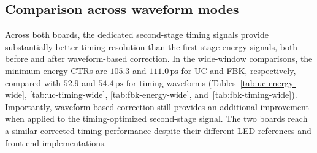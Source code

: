 \subsection{Comparison across waveform modes}
Across both boards, the dedicated second-stage timing signals provide
substantially better timing resolution than the first-stage energy signals,
both before and after waveform-based correction. In the wide-window
comparisons, the minimum energy CTRs are $105.3$ and $111.0\,\mathrm{ps}$
for UC and FBK, respectively, compared with $52.9$ and
$54.4\,\mathrm{ps}$ for timing waveforms
(Tables~\ref{tab:uc-energy-wide}, \ref{tab:uc-timing-wide},
\ref{tab:fbk-energy-wide}, and~\ref{tab:fbk-timing-wide}).
Importantly, waveform-based correction still provides an additional
improvement when applied to the timing-optimized second-stage signal.
The two boards reach a similar corrected timing performance despite
their different LED references and front-end implementations.

